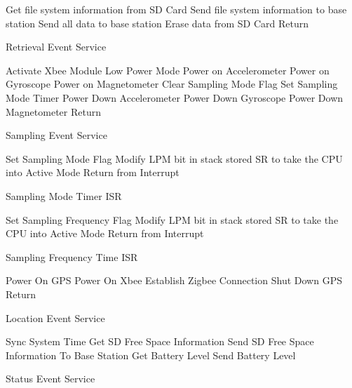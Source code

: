 \begin{algorithm}
\SetAlgoNoLine
Get file system information from SD Card\;
Send file system information to base station\;
Send all data to base station\;
Erase data from SD Card
Return\;
\caption{Retrieval Event Service}
\end{algorithm}

\begin{algorithm}
\SetAlgoNoLine
Activate Xbee Module Low Power Mode\;
Power on Accelerometer\;
Power on Gyroscope\;
Power on Magnetometer\;
Clear Sampling Mode Flag\;
Set Sampling Mode Timer\;
Power Down Accelerometer\;
Power Down Gyroscope\;
Power Down Magnetometer\;
Return\;
\caption{Sampling Event Service}
\end{algorithm}

\begin{algorithm}
\SetAlgoNoLine
Set Sampling Mode Flag\;
Modify LPM bit in stack stored SR to take the CPU into Active Mode\;
Return from Interrupt\;
\caption{Sampling Mode Timer ISR}
\end{algorithm}

\begin{algorithm}
\SetAlgoNoLine
Set Sampling Frequency Flag\;
Modify LPM bit in stack stored SR to take the CPU into Active Mode\;
Return from Interrupt\;
\caption{Sampling Frequency Time ISR}
\end{algorithm}

\begin{algorithm}
\SetAlgoNoLine
Power On GPS\;
Power On Xbee\;
Establish Zigbee Connection\;
Shut Down GPS\;
Return\;
\caption{Location Event Service}
\end{algorithm}

\begin{algorithm}
\SetAlgoNoLine
Sync System Time\;
Get SD Free Space Information\;
Send SD Free Space Information To Base Station\;
Get Battery Level\;
Send Battery Level\;
\caption{Status Event Service}
\end{algorithm}